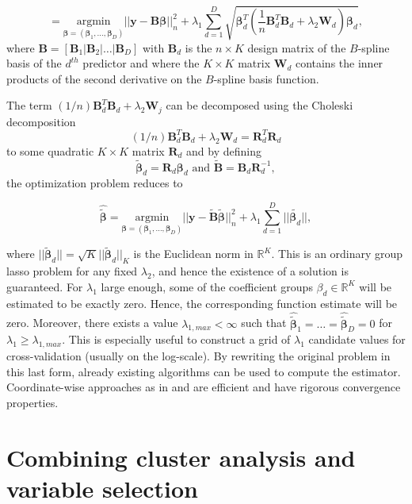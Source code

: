 \documentclass[]{book}
\begin{document}
\[= \underset{\boldsymbol{\beta}=(\boldsymbol{\beta}_1,\dots,\boldsymbol{\beta}_D)}{\text{argmin}} ||\mathbf{y} - \mathbf{B} \boldsymbol{\beta}||_n^2 +
\lambda_1 \sum_{d=1}^D \sqrt{\boldsymbol{\beta}_d^T \left( \frac{1}{n} \mathbf{B}_d^T \mathbf{B}_d + \lambda_2 \mathbf{W}_d \right) \boldsymbol{\beta}_d},\]
where \(\mathbf{B} = [\mathbf{B}_1|\mathbf{B}_2|\dots|\mathbf{B}_D]\) with \(\mathbf{B}_d\) is the \(n \times K\)
design matrix of the \(B\)-spline basis of the \(d^{th}\) predictor and
where the \(K \times K\) matrix \(\mathbf{W}_d\) contains the inner products of the
second derivative on the \(B\)-spline basis function.

The term \((1/n)\mathbf{B}_d^T \mathbf{B}_d + \lambda_2\mathbf{W}_j\) can be decomposed using
the Choleski decomposition
\[(1/n) \mathbf{B}_d^T\mathbf{B}_d + \lambda_2\mathbf{W}_d = \mathbf{R}_d^T \mathbf{R}_d\] to
some quadratic \(K \times K\) matrix \(\mathbf{R}_d\) and by defining
\[\tilde{\boldsymbol{\beta}}_d = \mathbf{R}_d \boldsymbol{\beta}_d \text{ and } \tilde{\mathbf{B}} = \mathbf{B}_d \mathbf{R}_d^{-1},\]
the optimization problem reduces to

\[\hat{\tilde{\boldsymbol{\beta}}} = \underset{\boldsymbol{\beta}=(\boldsymbol{\beta}_1,\dots,\boldsymbol{\beta}_D)}{\text{argmin}} ||\mathbf{y} - \tilde{\mathbf{B}}\tilde{\boldsymbol{\beta}}||^2_n + \lambda_1\sum_{d=1}^D||\tilde{\boldsymbol{\beta}_d}||,\]

where \(||\tilde{\boldsymbol{\beta}}_d|| = \sqrt{K}||\tilde{\boldsymbol{\beta}}_d||_K\) is the
Euclidean norm in \(\mathbb{R}^K\). This is an ordinary group lasso
problem for any fixed \(\lambda_2\), and hence the existence of a solution
is guaranteed. For \(\lambda_1\) large enough, some of the coefficient
groups \(\beta_d \in \mathbb{R}^K\) will be estimated to be exactly zero.
Hence, the corresponding function estimate will be zero. Moreover, there
exists a value \(\lambda_{1,max} < \infty\) such that
\(\hat{\tilde{\boldsymbol{\beta}}}_1 = \dots = \hat{\tilde{\boldsymbol{\beta}}}_D = 0\) for
\(\lambda_1 \geqslant \lambda_{1,max}\). This is especially useful to
construct a grid of \(\lambda_1\) candidate values for cross-validation
(usually on the log-scale). By rewriting the original problem in this
last form, already existing algorithms can be used to compute the
estimator. Coordinate-wise approaches as in \citep{meier_group_2008} and
\citep{yuan_model_2006} are efficient and have rigorous convergence
properties.

\hypertarget{combining-cluster-analysis-and-variable-selection}{%
\section{Combining cluster analysis and variable selection}\label{combining-cluster-analysis-and-variable-selection}}
\end{document}
